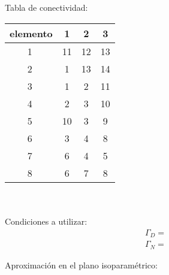 \documentclass[10pt]{article}
\begin{document}
\begin{minipage}{.2\textwidth}


\end{minipage}
\\ \\

Tabla de conectividad: \\

\begin{tabular}{|c|c|c|c|}
\hline
elemento & 1 & 2 & 3 \\
\hline 
\textcircled{1} & 11 & 12 & 13 \\
\textcircled{2} & 1 & 13 & 14 \\
\textcircled{3} & 1 & 2 & 11 \\
\textcircled{4} & 2 & 3 & 10 \\
\textcircled{5} & 10 & 3 & 9 \\
\textcircled{6} & 3 & 4 & 8 \\
\textcircled{7} & 6 & 4 & 5 \\
\textcircled{8} & 6 & 7 & 8 \\
\hline
\end{tabular}
\\ \\

Condiciones a utilizar: \\

\begin{align*}
\Gamma^{}_{D} =  \\
\Gamma^{}_{N} = 
\end{align*}
\newpage

Aproximaci\'on en el plano isoparam\'etrico: \\
\end{document}
